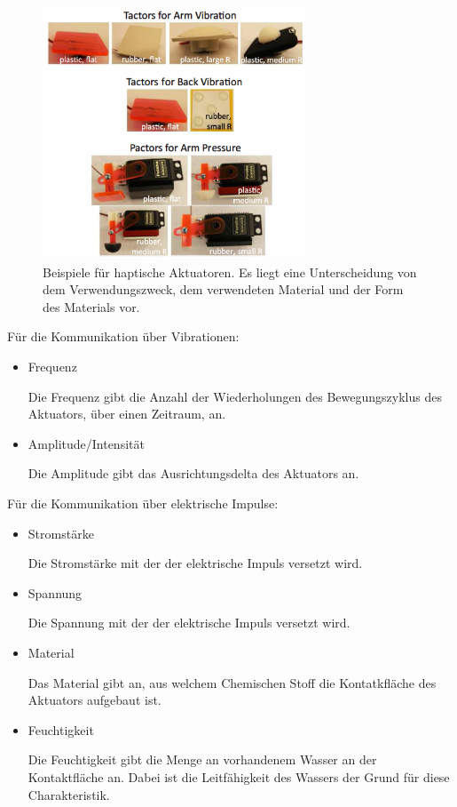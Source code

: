 \documentclass{llncs}					%
\begin{document}
\begin{figure}[htbp]
	\begin{center}
		\includegraphics[width = 8cm]{Grafiken/3-Haptische-Aktuatoren.png}
		\caption{Beispiele für haptische Aktuatoren\cite{6183832}. Es liegt eine Unterscheidung von dem Verwendungszweck, dem verwendeten Material und der Form des Materials vor.}
		\label{3-Haptische-Aktuatoren}
	\end{center}
\end{figure}

Für die Kommunikation über Vibrationen\cite{doi:10.1518/001872008X250638}:
\begin{itemize}
	\item Frequenz
	
	Die Frequenz gibt die Anzahl der Wiederholungen des Bewegungszyklus des Aktuators, über einen Zeitraum, an.
	
	\item Amplitude/Intensität %
	
	Die Amplitude gibt das Ausrichtungsdelta des Aktuators an.
\end{itemize}

Für die Kommunikation über elektrische Impulse\cite[S.~4]{68204}:
\begin{itemize}
	\item Stromstärke
	
	Die Stromstärke mit der der elektrische Impuls versetzt wird.
	
	\item Spannung
	
	Die Spannung mit der der elektrische Impuls versetzt wird.
	\item Material
	
	Das Material gibt an, aus welchem Chemischen Stoff die Kontatkfläche des Aktuators aufgebaut ist.
	\item Feuchtigkeit
	
	Die Feuchtigkeit gibt die Menge an vorhandenem Wasser an der Kontaktfläche an. Dabei ist die Leitfähigkeit des Wassers der Grund für diese Charakteristik.
\end{itemize}
\end{document}
